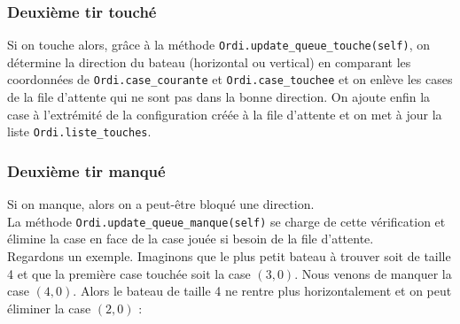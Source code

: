 \subsubsection{Deuxième tir touché}
Si on touche alors, grâce à la méthode \texttt{Ordi.update\_queue\_touche(self)}, on détermine la direction du bateau (horizontal ou vertical) en comparant les coordonnées de \texttt{Ordi.case\_courante} et \texttt{Ordi.case\_touchee} et on enlève les cases de la file d'attente qui ne sont pas dans la bonne direction. On ajoute enfin la case à l'extrémité de la configuration créée à la file d'attente et on met à jour la liste \texttt{Ordi.liste\_touches}. 
\subsubsection{Deuxième tir manqué}
Si on manque, alors on a peut-être bloqué une direction.\\
La méthode \texttt{Ordi.update\_queue\_manque(self)} se charge de cette vérification et élimine la case en face de la case jouée si besoin de la file d'attente.\\
Regardons un exemple. Imaginons que le plus petit bateau à trouver soit de taille 4 et que la première case touchée soit la case $(3,0)$. Nous venons de manquer la case $(4,0)$. Alors le bateau de taille 4 ne rentre plus horizontalement et on peut éliminer la case $(2,0)$ :

